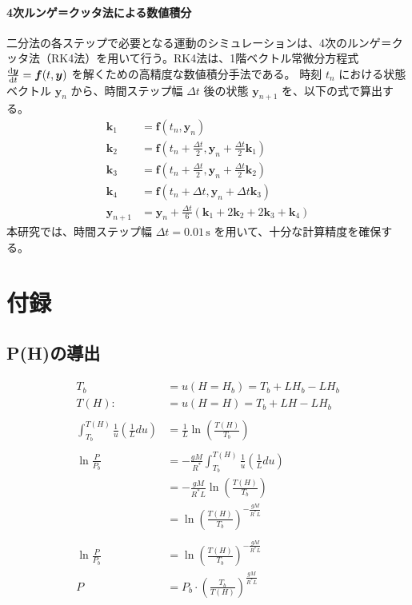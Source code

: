 \documentclass[a4paper,12pt]{article}
\begin{document}
\paragraph{4次ルンゲ＝クッタ法による数値積分}
\label{par:rk4}
二分法の各ステップで必要となる運動のシミュレーションは、4次のルンゲ＝クッタ法（RK4法）を用いて行う。RK4法は、1階ベクトル常微分方程式 $\dv{\bm{y}}{t} = \bm{f}(t, \bm{y})$ を解くための高精度な数値積分手法である。
時刻 $t_n$ における状態ベクトル $\bm{y}_n$ から、時間ステップ幅 $\Delta t$ 後の状態 $\bm{y}_{n+1}$ を、以下の式で算出する。
\begin{align*}
    \bm{k}_1 &= \bm{f}(t_n, \bm{y}_n) \\
    \bm{k}_2 &= \bm{f}\left(t_n + \frac{\Delta t}{2}, \bm{y}_n + \frac{\Delta t}{2}\bm{k}_1\right) \\
    \bm{k}_3 &= \bm{f}\left(t_n + \frac{\Delta t}{2}, \bm{y}_n + \frac{\Delta t}{2}\bm{k}_2\right) \\
    \bm{k}_4 &= \bm{f}(t_n + \Delta t, \bm{y}_n + \Delta t \bm{k}_3) \\
    \bm{y}_{n+1} &= \bm{y}_n + \frac{\Delta t}{6}(\bm{k}_1 + 2\bm{k}_2 + 2\bm{k}_3 + \bm{k}_4)
\end{align*}
本研究では、時間ステップ幅 $\Delta t = 0.01 \, \mathrm{s}$ を用いて、十分な計算精度を確保する。

\section{付録}
\subsection{P(H)の導出}

\begin{align*}
T_b&=u(H=H_b)=T_b+LH_b-LH_b\\
T(H):&=u(H=H)=T_b+LH-LH_b\\\\
\int^{T(H)}_{T_b} \frac{1}{u} \left( \frac{1}{L} du \right) &=\frac{1}{L} \ln \left( \frac{T(H)}{T_b} \right)\\\\
\ln \frac{P}{P_b}
&=- \frac{gM}{R^*} \int^{T(H)}_{T_b} \frac{1}{u} \left( \frac{1}{L} du \right)\\
&=- \frac{gM}{R^*L} \ln \left( \frac{T(H)}{T_b} \right)\\
&=\ln \left( \frac{T(H)}{T_b} \right) ^ {- \frac{gM}{R^*L}}\\\\
\ln \frac{P}{P_b}&=\ln \left( \frac{T(H)}{T_b} \right) ^ {- \frac{gM}{R^*L}}\\
P &= P_b \cdot \left( \frac{T_b}{T(H)} \right) ^ {\frac{gM}{R^*L}}\\
\end{align*}
\end{document}
